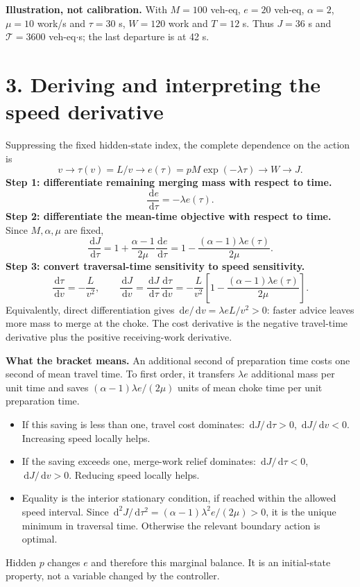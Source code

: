 \documentclass[11pt]{article}
\newcommand{\dd}{\,\mathrm{d}}
\begin{document}
\textbf{Illustration, not calibration.} With \(M=100\) veh-eq,
\(e=20\) veh-eq, \(\alpha=2\), \(\mu=10\) work/s and \(\tau=30\) s,
\(W=120\) work and \(T=12\) s. Thus \(J=36\) s and
\(\mathcal T=3600\) veh-eq\(\cdot\)s; the last departure is at 42 s.

\newpage
\section*{3. Deriving and interpreting the speed derivative}
Suppressing the fixed hidden-state index, the complete dependence on the action
is
\[
 v\longrightarrow\tau(v)=L/v
 \longrightarrow e(\tau)=pM\exp(-\lambda\tau)
 \longrightarrow W\longrightarrow J.
\]
\textbf{Step 1: differentiate remaining merging mass with respect to time.}
\[
 \frac{\dd e}{\dd\tau}=-\lambda e(\tau).
\]
\textbf{Step 2: differentiate the mean-time objective with respect to time.}
Since \(M,\alpha,\mu\) are fixed,
\[
 \frac{\dd J}{\dd\tau}
 =1+\frac{\alpha-1}{2\mu}\frac{\dd e}{\dd\tau}
 =1-\frac{(\alpha-1)\lambda e(\tau)}{2\mu}.
\]
\textbf{Step 3: convert traversal-time sensitivity to speed sensitivity.}
\[
 \frac{\dd\tau}{\dd v}=-\frac{L}{v^2},\qquad
 \boxed{\frac{\dd J}{\dd v}
 =\frac{\dd J}{\dd\tau}\frac{\dd\tau}{\dd v}
 =-\frac{L}{v^2}\left[1-
 \frac{(\alpha-1)\lambda e(\tau)}{2\mu}\right].}
\]
Equivalently, direct differentiation gives
\(\dd e/\dd v=\lambda e L/v^2>0\): faster advice leaves more mass to merge
at the choke. The cost derivative is the negative travel-time derivative
plus the positive receiving-work derivative.

\textbf{What the bracket means.} An additional second of preparation time
costs one second of mean travel time. To first order, it transfers
\(\lambda e\) additional mass per unit time and saves
\((\alpha-1)\lambda e/(2\mu)\) units of mean choke time per unit preparation time.
\begin{itemize}
\item If this saving is less than one, travel cost dominates:
\(\dd J/\dd\tau>0\), \(\dd J/\dd v<0\). Increasing speed locally helps.
\item If the saving exceeds one, merge-work relief dominates:
\(\dd J/\dd\tau<0\), \(\dd J/\dd v>0\). Reducing speed locally helps.
\item Equality is the interior stationary condition, if reached within the
allowed speed interval. Since
\(\dd^2J/\dd\tau^2=(\alpha-1)\lambda^2e/(2\mu)>0\), it is the unique
minimum in traversal time. Otherwise the relevant boundary action is optimal.
\end{itemize}
Hidden \(p\) changes \(e\) and therefore this marginal balance. It is an
initial-state property, not a variable changed by the controller.
\end{document}
